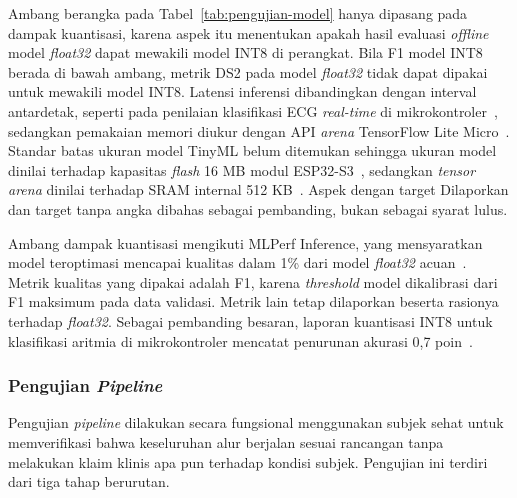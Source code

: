 Ambang berangka pada Tabel~\ref{tab:pengujian-model} hanya dipasang pada dampak kuantisasi, karena aspek itu menentukan apakah hasil evaluasi \textit{offline} model \textit{float32} dapat mewakili model INT8 di perangkat. Bila F1 model INT8 berada di bawah ambang, metrik DS2 pada model \textit{float32} tidak dapat dipakai untuk mewakili model INT8. Latensi inferensi dibandingkan dengan interval antardetak, seperti pada penilaian klasifikasi ECG \textit{real-time} di mikrokontroler~\cite{tran_2025}, sedangkan pemakaian memori diukur dengan API \textit{arena} TensorFlow Lite Micro~\cite{david_2021}. Standar batas ukuran model TinyML belum ditemukan sehingga ukuran model dinilai terhadap kapasitas \textit{flash} 16 MB modul ESP32-S3~\cite{espressif_esp32s3_wroom1}, sedangkan \textit{tensor arena} dinilai terhadap SRAM internal 512 KB~\cite{espressif_esp32s3_datasheet}. Aspek dengan target Dilaporkan dan target tanpa angka dibahas sebagai pembanding, bukan sebagai syarat lulus.

Ambang dampak kuantisasi mengikuti MLPerf Inference, yang mensyaratkan model teroptimasi mencapai kualitas dalam 1\% dari model \textit{float32} acuan~\cite{reddi_2020}. Metrik kualitas yang dipakai adalah F1, karena \textit{threshold} model dikalibrasi dari F1 maksimum pada data validasi. Metrik lain tetap dilaporkan beserta rasionya terhadap \textit{float32}. Sebagai pembanding besaran, laporan kuantisasi INT8 untuk klasifikasi aritmia di mikrokontroler mencatat penurunan akurasi 0,7 poin~\cite{zambrano_2026}.

\subsubsection{Pengujian \textit{Pipeline}}

Pengujian \textit{pipeline} dilakukan secara fungsional menggunakan subjek sehat untuk memverifikasi bahwa keseluruhan alur berjalan sesuai rancangan tanpa melakukan klaim klinis apa pun terhadap kondisi subjek. Pengujian ini terdiri dari tiga tahap berurutan.


